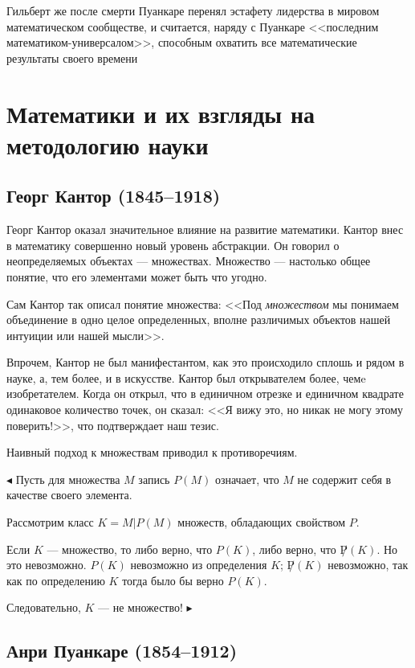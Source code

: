 \documentclass[a4paper,14pt]{article}
\begin{document}
Гильберт же после смерти Пуанкаре перенял эстафету лидерства в мировом математическом сообществе, и считается, наряду с Пуанкаре <<последним математиком-универсалом>>, способным охватить все математические результаты своего времени \cite{wiki_poincare}

\section{Математики и их взгляды на методологию науки}
\subsection{Георг Кантор (1845--1918)}
Георг Кантор оказал значительное влияние на развитие математики.
Кантор внес в математику совершенно новый уровень абстракции.
Он говорил о неопределяемых объектах --- множествах. Множество --- настолько общее понятие, что его элементами может быть что угодно.



Сам Кантор так описал понятие множества: <<Под \textit{множеством} мы понимаем объединение в одно целое определенных, вполне различимых объектов нашей интуиции или нашей мысли>>.

Впрочем, Кантор не был манифестантом, как это происходило сплошь и рядом в науке, а, тем более, и в искусстве.
Кантор был открывателем более, чемe изобретателем. Когда он открыл, что в единичном отрезке и единичном квадрате одинаковое количество точек, он сказал: <<Я вижу это, но никак не могу этому поверить!>>, что подтверждает наш тезис.

Наивный подход к множествам приводил к противоречиям.


$\blacktriangleleft$ Пусть для множества $M$ запись $P(M)$ означает, что $M$ не содержит себя в качестве своего элемента.

Рассмотрим класс $K={M|P(M)}$ множеств, обладающих свойством $P$.

Если $K$ --- множество, то либо верно, что $P(K)$, либо верно, что $\not P(K)$. Но это невозможно. $P(K)$ невозможно из определения $K$; $\not P(K)$ невозможно, так как по определению $K$ тогда было бы верно $P(K)$.

Следовательно, $K$ --- не множество! $\blacktriangleright$

\subsection{Анри Пуанкаре (1854--1912)}
\end{document}
